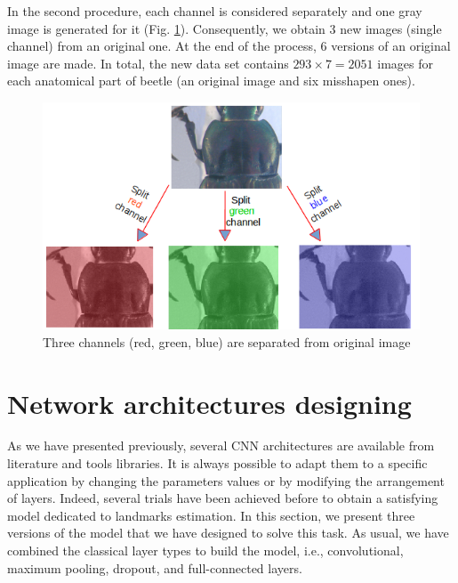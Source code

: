 \documentclass[review]{elsarticle}
\begin{document}
In the second procedure, each channel is considered separately and one
gray image is generated for it (Fig. \ref{figaug2}). Consequently, we
obtain 3 new images (single channel) from an original one. At the end
of the process, $6$ versions of an original image are made. In total,
the new data set contains $293 \times 7 = 2051$ images for each
anatomical part of beetle (an original image and six misshapen ones).


\begin{figure}[h]
	\centering
	\includegraphics[scale=0.4]{images/sp_channels}
	\caption{Three channels (red, green, blue) are separated from original image}
	\label{figaug2}
\end{figure}

\section{Network architectures designing}
\label{Sneuralnetwork}
As we have presented previously, several CNN architectures are
available from literature and tools libraries. It is always possible
to adapt them to a specific application by changing the parameters
values or by modifying the arrangement of layers. Indeed, several
trials have been achieved before to obtain a satisfying model
dedicated to landmarks estimation. In this section, we present three
versions of the model that we have designed to solve this task. As
usual, we have combined the classical layer types to build the model,
i.e., convolutional, maximum pooling, dropout, and full-connected
layers.
\end{document}
